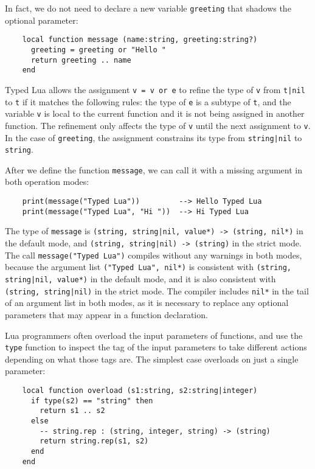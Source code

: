 In fact, we do not need to declare a new variable \texttt{greeting} that
shadows the optional parameter:
\begin{verbatim}
    local function message (name:string, greeting:string?)
      greeting = greeting or "Hello "
      return greeting .. name
    end
\end{verbatim}

Typed Lua allows the assignment \texttt{v = v or e} to refine
the type of \texttt{v} from \texttt{t|nil} to \texttt{t}
if it matches the following rules: 
the type of \texttt{e} is a subtype of \texttt{t},
and the variable \texttt{v} is local to the current function
and it is not being assigned in another function.
The refinement only affects the type of \texttt{v} until the
next assignment to \texttt{v}.
In the case of \texttt{greeting}, the assignment constrains its type
from \texttt{string|nil} to \texttt{string}. 

After we define the function \texttt{message}, we can call it
with a missing argument in both operation modes:
\begin{verbatim}
    print(message("Typed Lua"))         --> Hello Typed Lua
    print(message("Typed Lua", "Hi "))  --> Hi Typed Lua
\end{verbatim}

The type of \texttt{message} is
\texttt{(string, string|nil, value*) -> (string, nil*)}
in the default mode, and
\texttt{(string, string|nil) -> (string)}
in the strict mode.
The call \texttt{message("Typed Lua")} compiles without
any warnings in both modes, because the argument list
\texttt{("Typed Lua", nil*)} is consistent with
\texttt{(string, string|nil, value*)} in the default mode,
and it is also consistent with  
\texttt{(string, string|nil)} in the strict mode.
The compiler includes \texttt{nil*} in the tail of
an argument list in both modes, as it is necessary
to replace any optional parameters that may appear in
a function declaration.

Lua programmers often overload the input parameters of functions,
and use the \texttt{type} function to inspect the tag of the
input parameters to take different actions depending on what
those tags are.
The simplest case overloads on just a single parameter:
\begin{verbatim}
    local function overload (s1:string, s2:string|integer)
      if type(s2) == "string" then
        return s1 .. s2
      else
        -- string.rep : (string, integer, string) -> (string)
        return string.rep(s1, s2)
      end
    end
\end{verbatim}

